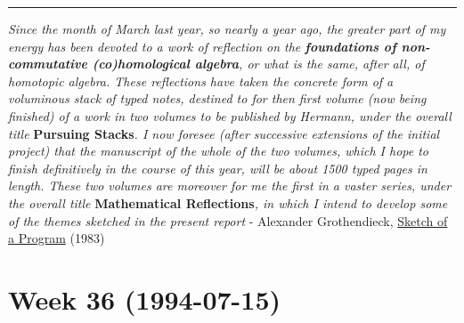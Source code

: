 \documentclass{article}
\renewcommand{\texttt}[1]{%
  \begingroup
  \ttfamily
  \begingroup\lccode`~=`/\lowercase{\endgroup\def~}{/\discretionary{}{}{}}%
  \begingroup\lccode`~=`[\lowercase{\endgroup\def~}{[\discretionary{}{}{}}%
  \begingroup\lccode`~=`.\lowercase{\endgroup\def~}{.\discretionary{}{}{}}%
  \catcode`/=\active\catcode`[=\active\catcode`.=\active
  \scantokens{#1\noexpand}%
  \endgroup
}
\begin{document}

\begin{center}\rule{0.5\linewidth}{0.5pt}\end{center}

\emph{Since the month of March last year, so nearly a year ago, the
greater part of my energy has been devoted to a work of reflection on
the \textbf{foundations of non-commutative (co)homological algebra}, or
what is the same, after all, of homotopic algebra. These reflections
have taken the concrete form of a voluminous stack of typed notes,
destined to for then first volume (now being finished) of a work in two
volumes to be published by Hermann, under the overall title}
\textbf{Pursuing Stacks}\emph{. I now foresee (after successive
extensions of the initial project) that the manuscript of the whole of
the two volumes, which I hope to finish definitively in the course of
this year, will be about 1500 typed pages in length. These two volumes
are moreover for me the first in a vaster series, under the overall
title} \textbf{Mathematical Reflections}\emph{, in which I intend to
develop some of the themes sketched in the present report} - Alexander
Grothendieck, \href{http://www.grothendieckcircle.org/}{Sketch of a
Program} (1983)
\hypertarget{week-36-1994-07-15}{%
\section{Week 36 (1994-07-15)}\label{week-36-1994-07-15}}
\end{document}
